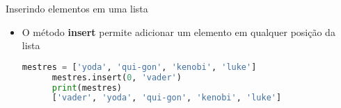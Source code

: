 %
\begin{frame}{Inserindo elementos em uma lista}
  \begin{itemize}
    \item O método {\bf insert} permite adicionar um elemento em qualquer posição da lista
    \begin{lstlisting}[language=python]
      mestres = ['yoda', 'qui-gon', 'kenobi', 'luke']
      mestres.insert(0, 'vader')
      print(mestres)
      ['vader', 'yoda', 'qui-gon', 'kenobi', 'luke']
    \end{lstlisting} 
  \end{itemize}
\end{frame}


 